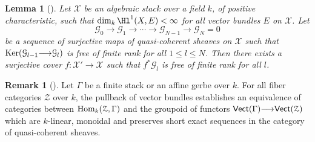\documentclass[12pt,reqno]{amsart}
\theoremstyle{plain}
\newtheorem{lem}[thm]{Lemma}
\theoremstyle{definition}
\newtheorem{rmk}[thm]{Remark}
\numberwithin{thm}{section}
\newcounter{x}\setcounter{x}{1}
\theoremstyle{plain}
\begin{document}
\begin{lem}[{\cite[Lemma 2.5]{TZ2}}]\label{extensions of O}
 Let ${\mathcal{X}}$ be an algebraic stack over a field $k$, of positive characteristic, such
that $\dim_k \Hl^1(X,E) <\infty$ for all vector bundles $E$ on ${\mathcal{X}}$. Let
 \[
 {\mathcal{G}}_0 {\longrightarrow} {\mathcal{G}}_1 {\longrightarrow} \cdots {\longrightarrow} {\mathcal{G}}_{N-1} {\longrightarrow} {\mathcal{G}}_N=0
 \]
 be a sequence of surjective maps of quasi-coherent sheaves on ${\mathcal{X}}$ such that
${{\rm Ker}}({\mathcal{G}}_{l-1} {\longrightarrow} {\mathcal{G}}_l)$ is free of finite rank for all $1\leq l \leq N$. Then there exists
a surjective cover $f\colon {\mathcal{X}}'{\longrightarrow} {\mathcal{X}}$ such that $f^*{\mathcal{G}}_l$ is free of finite rank for
all $l$.
\end{lem}

\begin{rmk}[{\cite[Example 1.5, Corollary 1.7]{TZ}}]\label{Tannakian reconstruction}
Let $\Gamma$ be a finite stack or an affine gerbe over $k$. For all fiber categories
${\mathcal{Z}}$ over $k$, the pullback of vector bundles establishes an equivalence
of categories between ${{\rm Hom}}_k({\mathcal{Z}},\Gamma)$ and the groupoid of functors
${\text{\sf Vect}}(\Gamma){\longrightarrow} {\text{\sf Vect}}({\mathcal{Z}})$ which are $k$-linear, monoidal and preserves short
exact sequences in the category of quasi-coherent sheaves. 
\end{rmk}
\end{document}
